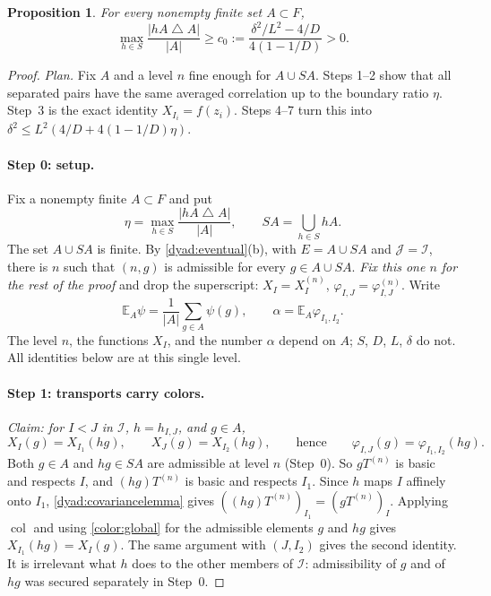 \documentclass[11pt]{article}
\DeclareMathOperator{\colr}{col}
\newtheorem{proposition}[theorem]{Proposition}
\theoremstyle{definition}
\numberwithin{equation}{section}
\begin{document}
\begin{proposition}\label{avg:boundary}
For every nonempty finite set \(A\subset F\),
\begin{equation}\label{avg:boundary-bound}
  \max_{h\in S}\frac{|hA\mathbin{\triangle}A|}{|A|}
  \geq c_0:=\frac{\delta^2/L^2-4/D}{4(1-1/D)}>0.
\end{equation}
\end{proposition}

\begin{proof}
\emph{Plan.} Fix \(A\) and a level \(n\) fine enough for \(A\cup SA\). Steps
1--2 show that all separated pairs have the same averaged correlation up to
the boundary ratio \(\eta\). Step~3 is the exact identity
\(X_{I_i}=f(z_i)\). Steps 4--7 turn this into
\(\delta^2\le L^2(4/D+4(1-1/D)\eta)\).

\paragraph{Step 0: setup.}
Fix a nonempty finite \(A\subset F\) and put
\begin{equation}\label{avg:defect}
  \eta=\max_{h\in S}\frac{|hA\mathbin{\triangle}A|}{|A|},
  \qquad SA=\bigcup_{h\in S}hA .
\end{equation}
The set \(A\cup SA\) is finite. By \cref{dyad:eventual}(b), with
\(E=A\cup SA\) and \(\mathcal J=\mathcal I\), there is \(n\) such that
\((n,g)\) is admissible for every \(g\in A\cup SA\). \emph{Fix this one \(n\)
for the rest of the proof} and drop the superscript:
\(X_I=X_I^{(n)}\), \(\varphi_{I,J}=\varphi_{I,J}^{(n)}\). Write
\[
  \mathbb E_A\psi=\frac1{|A|}\sum_{g\in A}\psi(g),
  \qquad
  \alpha=\mathbb E_A\varphi_{I_1,I_2}.
\]
The level \(n\), the functions \(X_I\), and the number \(\alpha\) depend on
\(A\); \(S\), \(D\), \(L\), \(\delta\) do not. All identities below are at
this single level.

\paragraph{Step 1: transports carry colors.}
\emph{Claim: for \(I<J\) in \(\mathcal I\), \(h=h_{I,J}\), and \(g\in A\),}
\[
  X_I(g)=X_{I_1}(hg),\qquad
  X_J(g)=X_{I_2}(hg),\qquad\text{hence}\qquad
  \varphi_{I,J}(g)=\varphi_{I_1,I_2}(hg).
\]
Both \(g\in A\) and \(hg\in SA\) are admissible at level \(n\) (Step~0). So
\(gT^{(n)}\) is basic and respects \(I\), and \((hg)T^{(n)}\) is basic and
respects \(I_1\). Since \(h\) maps \(I\) affinely onto \(I_1\),
\cref{dyad:covariancelemma} gives
\(((hg)T^{(n)})_{I_1}=(gT^{(n)})_I\). Applying \(\colr\) and using
\eqref{color:global} for the admissible elements \(g\) and \(hg\) gives
\(X_{I_1}(hg)=X_I(g)\). The same argument with \((J,I_2)\) gives the second
identity. It is irrelevant what \(h\) does to the other members of
\(\mathcal I\): admissibility of \(g\) and of \(hg\) was secured separately in
Step~0.


\end{proof}
\end{document}
